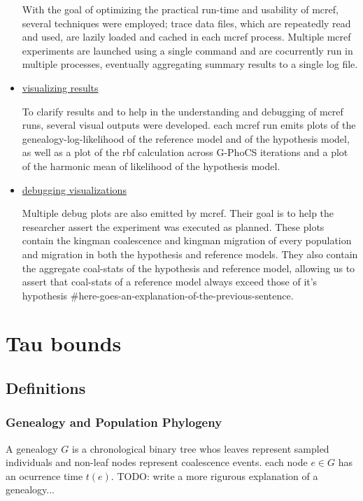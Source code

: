 \documentclass[11pt]{article}
\newcommand{\1}{\mathbbm{1}}
\newcommand{\gp}{G-PhoCS }
\begin{document}
\begin{itemize}
With the goal of optimizing the practical run-time and usability of mcref, several techniques were employed; trace data files, which are repeatedly read and used, are lazily loaded and cached in each mcref process. Multiple mcref experiments are launched using a single command and are cocurrently run in multiple processes, eventually aggregating summary results to a single log file. 

\item \underline{visualizing results}

To clarify results and to help in the understanding and debugging of mcref runs, several visual outputs were developed. each mcref run emits plots of the genealogy-log-likelihood of the reference model and of the hypothesis model, as well as a plot of the rbf calculation across \gp iterations and a plot of the harmonic mean of likelihood of the hypothesis model.

\item \underline{debugging visualizations}

Multiple debug plots are also emitted by mcref. Their goal is to help the researcher assert the experiment was executed as planned. These plots contain the kingman coalescence and kingman migration of every population and migration in both the hypothesis and reference models. They also contain the aggregate coal-stats of the hypothesis and reference model, allowing us to assert that coal-stats of a reference model always exceed those of it's hypothesis \#here-goes-an-explanation-of-the-previous-sentence. 
\end{itemize}



\section{Tau bounds}

\subsection{Definitions}

\subsubsection{Genealogy and Population Phylogeny}
A genealogy $G$ is a chronological binary tree whos leaves represent sampled individuals and non-leaf nodes represent coalescence events. each node $e \in G$ has an ocurrence time $t(e)$. TODO: write a more rigurous explanation of a genealogy...
\end{document}
